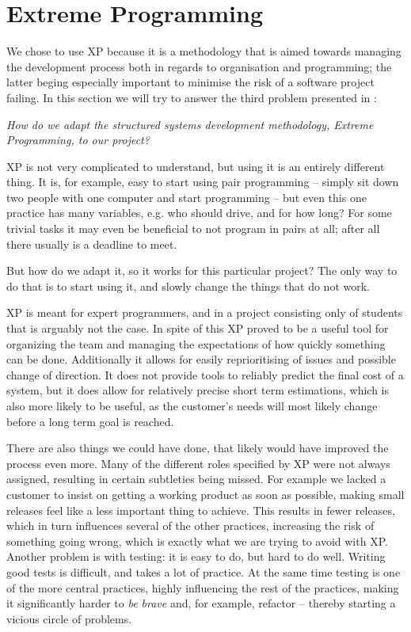 \section{Extreme Programming}
We chose to use XP because it is a methodology that is aimed towards managing the development process both in regards to organisation and programming; the latter beging especially important to minimise the risk of a software project failing. In this section we will try to answer the third problem presented in :
\begin{center}
	\textit{How do we adapt the structured systems development methodology, Extreme Programming, to our project?}
\end{center}

\noindent XP is not very complicated to understand, but using it is an entirely different thing. It is, for example, easy to start using pair programming -- simply sit down two people with one computer and start programming -- but even this one practice has many variables, e.g. who should drive, and for how long? For some trivial tasks it may even be beneficial to not program in pairs at all; after all there usually is a deadline to meet.

But how do we adapt it, so it works for this particular project? The only way to do that is to start using it, and slowly change the things that do not work.



XP is meant for expert programmers, and in a project consisting only of students that is arguably not the case. In spite of this XP proved to be a useful tool for organizing the team and managing the expectations of how quickly something can be done. Additionally it allows for easily reprioritising of issues and possible change of direction. It does not provide tools to reliably predict the final cost of a system, but it does allow for relatively precise short term estimations, which is also more likely to be useful, as the customer's needs will most likely change before a long term goal is reached.

There are also things we could have done, that likely would have improved the process even more. Many of the different roles specified by XP were not always assigned, resulting in certain subtleties being missed. For example we lacked a customer to insist on getting a working product as soon as possible, making small releases feel like a less important thing to achieve. This results in fewer releases, which in turn influences several of the other practices, increasing the risk of something going wrong, which is exactly what we are trying to avoid with XP.
Another problem is with testing: it is easy to do, but hard to do well. Writing good tests is difficult, and takes a lot of practice. At the same time testing is one of the more central practices, highly influencing the rest of the practices, making it significantly harder to \textit{be brave} and, for example, refactor -- thereby starting a vicious circle of problems. 

